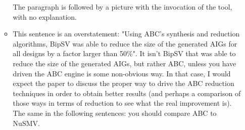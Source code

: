 \begin{itemize}
\begin{itemize}
The paragraph is followed by a picture with the invocation of the tool, with
no explanation.

\item This sentence is an overstatement: "Using ABC’s synthesis and reduction
algorithms, BipSV was able to reduce the size of the generated AIGs for all
designs by a factor larger than 50\%". It isn't BipSV that was able to reduce
the size of the generated AIGs, but rather ABC, unless you have driven the
ABC engine is some non-obvious way. In that case, I would expect the paper
to discuss the proper way to drive the ABC reduction techniques in order to
obtain better results (and perhaps a comparison of those ways in terms of
reduction to see what the real improvement is). The same in the following
sentences: you should compare ABC to NuSMV.

\end{itemize}
\end{itemize}

















